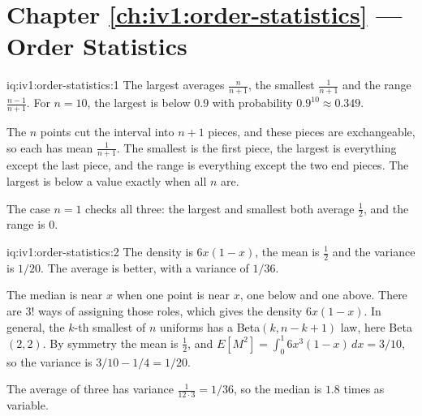 \section*{Chapter \ref{ch:iv1:order-statistics} --- Order Statistics}

\begin{solution}{iq:iv1:order-statistics:1}
The largest averages $\frac{n}{n + 1}$, the smallest $\frac{1}{n + 1}$ and the range $\frac{n - 1}{n + 1}$. For $n = 10$, the largest is below $0.9$ with probability $0.9^{10} \approx 0.349$.

The $n$ points cut the interval into $n + 1$ pieces, and these pieces are exchangeable, so each has mean $\frac{1}{n + 1}$. The smallest is the first piece, the largest is everything except the last piece, and the range is everything except the two end pieces. The largest is below a value exactly when all $n$ are.

The case $n = 1$ checks all three: the largest and smallest both average $\tfrac12$, and the range is 0.

\end{solution}

\begin{solution}{iq:iv1:order-statistics:2}
The density is $6x(1 - x)$, the mean is $\tfrac12$ and the variance is $1/20$. The average is better, with a variance of $1/36$.

The median is near $x$ when one point is near $x$, one below and one above. There are $3!$ ways of assigning those roles, which gives the density $6x(1 - x)$. In general, the $k$-th smallest of $n$ uniforms has a Beta$(k, n - k + 1)$ law, here Beta$(2, 2)$. By symmetry the mean is $\tfrac12$, and $E[M^2] = \int_0^1 6x^3(1 - x)\,dx = 3/10$, so the variance is $3/10 - 1/4 = 1/20$.

The average of three has variance $\frac{1}{12 \cdot 3} = 1/36$, so the median is $1.8$ times as variable.

\end{solution}

